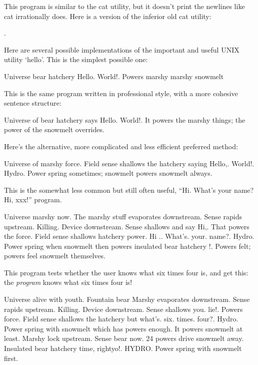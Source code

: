 \documentclass[10pt]{article}
\begin{document}
This program is similar to the cat utility, but it doesn't print the newlines like cat irrationally does. Here is a version of the inferior old cat utility:

\begin{verbatim*}

.
\end{verbatim*}

Here are several possible implementations of the important and useful UNIX utility `hello'. This is the simplest possible one:

\begin{verbatim*}
Universe bear hatchery Hello. World!.
 Powers   marshy marshy snowmelt
\end{verbatim*}

This is the same program written in professional style, with a more cohesive sentence structure:

\begin{verbatim*}
Universe of bear hatchery says Hello. World!.
 It   powers     the marshy things;
the power of the snowmelt overrides.
\end{verbatim*}

Here's the alternative, more complicated and less efficient preferred method:

\begin{verbatim*}
Universe of marshy force. Field sense
shallows the hatchery saying Hello,. World!.
 Hydro. Power spring  sometimes; snowmelt
      powers   snowmelt always.
\end{verbatim*}

This is the somewhat less common but still often useful, ``Hi. What's your name? Hi, xxx!'' program.

\begin{verbatim*}
Universe marshy now. The marshy stuff evaporates downstream. Sense rapids
upstream. Killing. Device downstream. Sense shallows and say Hi,. 
   That powers the     force. Field sense shallows hatchery power.
Hi .. What's. your. name?. 
  Hydro. Power spring  when snowmelt then       powers
    insulated bear hatchery !.
 Powers felt;       powers feel     snowmelt themselves.
\end{verbatim*}

This program tests whether the user knows what six times four is, and get this: the \textit{program} knows what six times four is!

\begin{verbatim*}
Universe alive with youth. Fountain bear Marshy
evaporates downstream. Sense rapids
upstream. Killing. Device downstream. Sense shallows you. lie!.
 Powers   force. Field sense shallows the hatchery but
what's. six. times. four?. 
  Hydro. Power spring  with snowmelt which has
       powers enough.
        It powers    snowmelt at least.
       Marshy lock upstream. Sense bear now.
24  powers drive   snowmelt away.
   Insulated bear hatchery time, rightyo!.
 HYDRO. Power spring  with snowmelt first.
\end{verbatim*}
\end{document}

